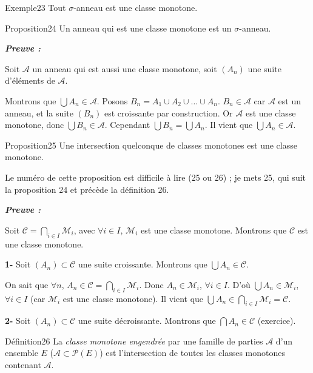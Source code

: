 \documentclass[11pt,a4paper]{article}
\newcommand{\A}{\mathscr{A}}
\newcommand{\C}{\mathscr{C}}
\newcommand{\M}{\mathscr{M}}
\newcommand{\Pp}{\mathscr{P}}
\newenvironment{preuve}{\par\textit{\textbf{Preuve :}}\par\nopagebreak[4]}{\par}
\begin{document}
\begin{enonce}{Exemple}{23}
Tout $\sigma$-anneau est une classe monotone.
\end{enonce}

\begin{enonce}{Proposition}{24}
Un anneau qui est une classe monotone est un $\sigma$-anneau.
\end{enonce}

\begin{preuve}
Soit $\A$ un anneau qui est aussi une classe monotone, soit $(A_n)$ une suite d'éléments de $\A$.

Montrons que $\bigcup A_n\in\A$. Posons $B_n=A_1\cup A_2\cup\dots\cup A_n$.
$B_n\in\A$ car $\A$ est un anneau, et la suite $(B_n)$ est croissante par construction.
Or $\A$ est une classe monotone, donc $\bigcup B_n\in\A$. Cependant $\bigcup B_n=\bigcup A_n$.
Il vient que $\bigcup A_n\in\A$.
\end{preuve}

\begin{enonce}{Proposition}{25}
Une intersection quelconque de classes monotones est une classe monotone.
\end{enonce}

\begin{note}
Le numéro de cette proposition est difficile à lire (25 ou 26) ; je mets 25, qui suit la proposition 24 et précède la définition 26.
\end{note}

\begin{preuve}
Soit $\C=\bigcap_{i\in I}\M_i$, avec $\forall i\in I$, $\M_i$ est une classe monotone.
Montrons que $\C$ est une classe monotone.

\textbf{1-} Soit $(A_n)\subset\C$ une suite croissante. Montrons que $\bigcup A_n\in\C$.

On sait que $\forall n$, $A_n\in\C=\bigcap_{i\in I}\M_i$. Donc $A_n\in\M_i$, $\forall i\in I$.
D'où $\bigcup A_n\in\M_i$, $\forall i\in I$ (car $\M_i$ est une classe monotone).
Il vient que $\bigcup A_n\in\bigcap_{i\in I}\M_i=\C$.

\textbf{2-} Soit $(A_n)\subset\C$ une suite décroissante. Montrons que $\bigcap A_n\in\C$ (exercice).
\end{preuve}

\begin{enonce}{Définition}{26}
La \emph{classe monotone engendrée} par une famille de parties $\A$ d'un ensemble $E$ ($\A\subset\Pp(E)$) est l'intersection de toutes les classes monotones contenant $\A$.
\end{enonce}
\end{document}
